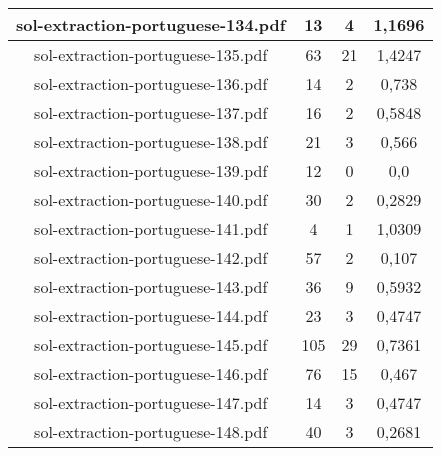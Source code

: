 \documentclass[11pt]{article}
\newlength\mylength
\begin{document}
\begin{center}
\begin{longtable}{||C{.40\mylength}||C{.30\mylength}||C{.30\mylength}||C{.30\mylength}||}
  sol-extraction-portuguese-134.pdf & 13 & 4 & 1,1696 \\  \hline
  sol-extraction-portuguese-135.pdf & 63 & 21 & 1,4247 \\  \hline
  sol-extraction-portuguese-136.pdf & 14 & 2 & 0,738 \\  \hline
  sol-extraction-portuguese-137.pdf & 16 & 2 & 0,5848 \\  \hline
  sol-extraction-portuguese-138.pdf & 21 & 3 & 0,566 \\  \hline
  sol-extraction-portuguese-139.pdf & 12 & 0 & 0,0 \\  \hline
  sol-extraction-portuguese-140.pdf & 30 & 2 & 0,2829 \\  \hline
  sol-extraction-portuguese-141.pdf & 4 & 1 & 1,0309 \\  \hline
  sol-extraction-portuguese-142.pdf & 57 & 2 & 0,107 \\  \hline
  sol-extraction-portuguese-143.pdf & 36 & 9 & 0,5932 \\  \hline
  sol-extraction-portuguese-144.pdf & 23 & 3 & 0,4747 \\  \hline
  sol-extraction-portuguese-145.pdf & 105 & 29 & 0,7361 \\  \hline
  sol-extraction-portuguese-146.pdf & 76 & 15 & 0,467 \\  \hline
  sol-extraction-portuguese-147.pdf & 14 & 3 & 0,4747 \\  \hline
  sol-extraction-portuguese-148.pdf & 40 & 3 & 0,2681 \\  \hline

\end{longtable}
\end{center}
\end{document}
